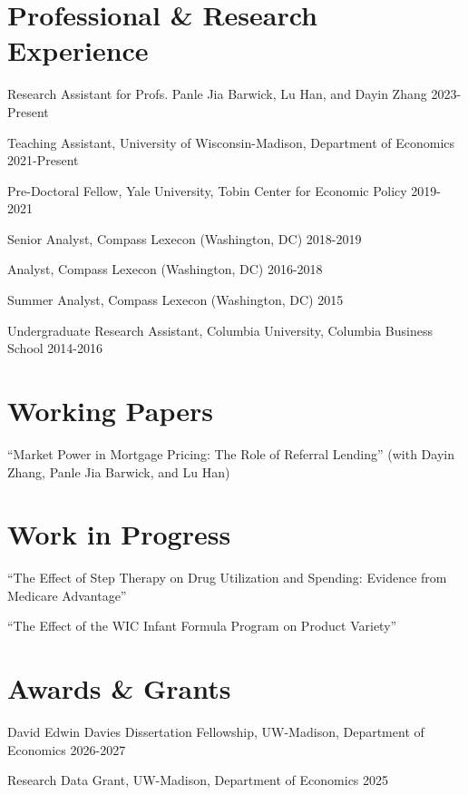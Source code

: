 \documentclass[letterpaper]{article}
\renewenvironment{itemize}{
	\begin{list}{}{
			\setlength{\leftmargin}{1.5em}
		}
	}{
	\end{list}
}
\begin{document}
	
	\section*{Professional \& Research Experience}
	\begin{itemize}
		\item Research Assistant for Profs. Panle Jia Barwick, Lu Han, and Dayin Zhang \hfill 2023-Present
		\item Teaching Assistant, University of Wisconsin-Madison, Department of Economics \hfill 2021-Present
		\item Pre-Doctoral Fellow, Yale University, Tobin Center for Economic Policy \hfill 2019-2021
		\item Senior Analyst, Compass Lexecon (Washington, DC) \hfill 2018-2019
		\item Analyst, Compass Lexecon (Washington, DC) \hfill 2016-2018
		\item Summer Analyst, Compass Lexecon (Washington, DC) \hfill 2015
		\item Undergraduate Research Assistant, Columbia University, Columbia Business School \hfill 2014-2016
	\end{itemize}
	
	
	\section*{Working Papers}
	\begin{itemize}
		\item ``Market Power in Mortgage Pricing: The Role of Referral Lending'' (with Dayin Zhang, Panle Jia Barwick, and Lu Han)
	\end{itemize}
	
	\section*{Work in Progress}
	\begin{itemize}
		\item ``The Effect of Step Therapy on Drug Utilization and Spending: Evidence from Medicare Advantage''
		\item ``The Effect of the WIC Infant Formula Program on Product Variety''
	\end{itemize}

	\section*{Awards \& Grants}
	\begin{itemize}
		\item David Edwin Davies Dissertation Fellowship, UW-Madison, Department of Economics \hfill 2026-2027
		\item Research Data Grant, UW-Madison, Department of Economics \hfill 2025
	\end{itemize}
	
\end{document}
